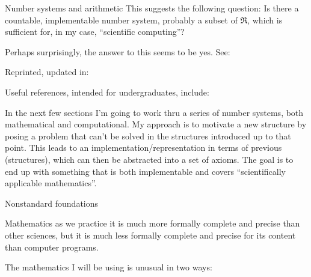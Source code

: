 \documentclass[12pt]{PalisadesLakesBook}
\begin{document}
\begin{plSection}{Number systems and arithmetic}
This suggests the following question:
Is there a countable, implementable number system,
probably a subset of $\Re$,
which is sufficient for, in my case,
``scientific computing''?

Perhaps surprisingly, the answer to this seems to be yes.
See: 



Reprinted, updated in:




Useful references, intended for undergraduates, include:
 



In the next few sections I'm going to work thru a series
of number systems, both mathematical and computational.
My approach is to motivate a new structure
by posing a problem that can't be solved in the structures
introduced up to that point.
This leads to an implementation/representation
in terms of previous (structures),
which can then be abstracted into a set of axioms.
The goal is to end up with something that is both
implementable and covers ``scientifically applicable mathematics''.

\begin{plSection}{Nonstandard foundations}

\begin{plQuote}
{}{}%
{Mathematics as we practice it is much more formally 
complete and precise than
other sciences, but it is much less formally complete and precise 
for its content than computer programs.
}
\end{plQuote}

The mathematics I will be using is unusual in two ways:

\begin{itemize}
  

\end{itemize}
\end{plSection}
\end{plSection}
\end{document}
